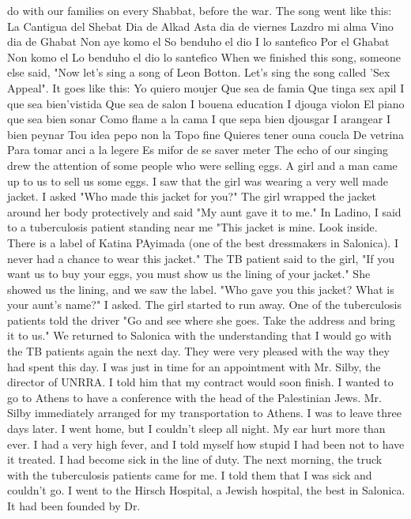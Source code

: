 do with our families on every Shabbat, before the war.
The song went like this: 
La Cantigua del Shebat 
Dia de Alkad 
Asta dia de viernes 
Lazdro mi alma 
Vino dia de Ghabat 
Non aye komo el 
So benduho el dio 
I lo santefico 
Por el Ghabat 
Non komo el 
Lo benduho el dio 
lo santefico 
When we finished this song, someone else said, "Now let's sing a song of Leon Botton.
Let's sing the song called 'Sex Appeal".
It goes like this: 
Yo quiero moujer 
Que sea de famia 
Que tinga sex apil 
I que sea bien'vistida 
Que sea de salon 
I bouena education 
I djouga violon 
El piano que sea bien sonar 
Como flame a la cama 
I que sepa bien djousgar 
I arangear 
I bien peynar 
Tou idea pepo non la 
Topo fine 
Quieres tener ouna coucla 
De vetrina 
Para tomar anci a la legere 
Es mifor de se saver meter 
The echo of our singing drew the attention of some people who were selling eggs.
A girl and a man came up to us to sell us some eggs.
I saw that the girl was wearing 
a very well made jacket.
I asked "Who made this jacket for you?"
The girl wrapped the 
jacket around her body protectively and said "My aunt gave it to me."
In Ladino, I said to a tuberculosis patient standing near me "This jacket is mine.
Look inside.
There is a label of Katina PAyimada (one of the best dressmakers in Salonica).
I never had a chance to wear this jacket."
The TB patient said to the girl, "If you want us to buy your eggs, you must show 
us the lining of your jacket."
She showed us the lining, and we saw the label.
"Who gave you this jacket?
What is your aunt's name?"
I asked.
The girl started 
to run away.
One of the tuberculosis patients told the driver "Go and see where she goes.
Take 
the address and bring it to us."
We returned to Salonica with the understanding that I would go with the TB patients
again the next day.
They were very pleased with the way they had spent this day.
I 
was just in time for an appointment with Mr.
Silby, the director of UNRRA.
I told him 
that my contract would soon finish.
I wanted to go to Athens to have a conference with 
the head of the Palestinian Jews.
Mr.
Silby immediately arranged for my transportation 
to Athens.
I was to leave three days later.
I went home, but I couldn't sleep all night.
My ear hurt more than ever.
I had a 
very high fever, and I told myself how stupid I had been not to have it treated.
I had 
become sick in the line of duty.
The next morning, the truck with the tuberculosis patients came 
for me.
I told them that I was sick and couldn't go.
I went to the Hirsch Hospital, a Jewish hospital, the best in Salonica.
It had 
been founded by Dr.
